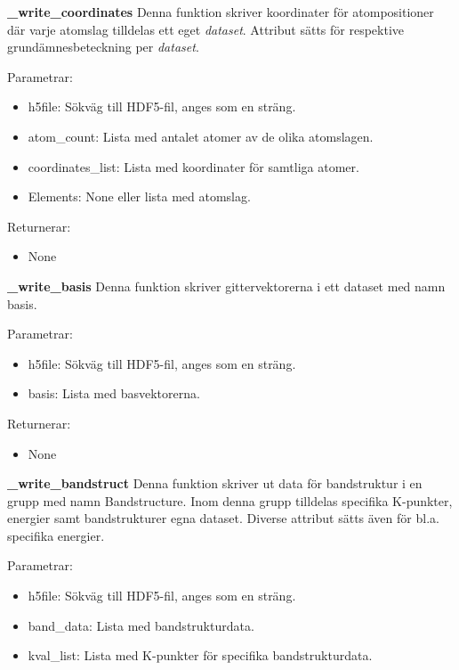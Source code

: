 \textbf{\_write\_coordinates}
\newline 
Denna funktion skriver koordinater för atompositioner där varje atomslag tilldelas ett eget \textit{dataset}. Attribut sätts för respektive grundämnesbeteckning per \textit{dataset}.

Parametrar:
\begin{itemize}
    \setlength\itemsep{0em}
    \item h5file: Sökväg till HDF5-fil, anges som en sträng. 
    \item atom\_count: Lista med antalet atomer av de olika atomslagen.
    \item coordinates\_list: Lista med koordinater för samtliga atomer.     
    \item Elements: None eller lista med atomslag.      
\end{itemize}

Returnerar: 
\begin{itemize}
    \item None 
\end{itemize}

\textbf{\_write\_basis}
\newline 
Denna funktion skriver gittervektorerna i ett dataset med namn basis.

Parametrar:
\begin{itemize}
    \setlength\itemsep{0em}
    \item h5file: Sökväg till HDF5-fil, anges som en sträng.
    \item basis: Lista med basvektorerna.
\end{itemize}

Returnerar: 
\begin{itemize}
    \item None 
\end{itemize}

\textbf{\_write\_bandstruct}
\newline 
Denna funktion skriver ut data för bandstruktur i en grupp med namn Bandstructure. Inom denna grupp tilldelas specifika K-punkter, energier samt bandstrukturer egna dataset. Diverse attribut sätts även för bl.a. specifika energier.

Parametrar:
\begin{itemize}
    \setlength\itemsep{0em}
    \item h5file: Sökväg till HDF5-fil, anges som en sträng. 
    \item band\_data: Lista med bandstrukturdata.
    \item kval\_list: Lista med K-punkter för specifika bandstrukturdata.
\end{itemize}

